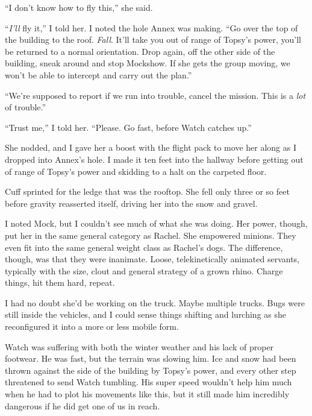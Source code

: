 ``I don't know how to fly this,'' she said.



``\emph{I'll} fly it,'' I told her.  I noted the hole Annex was making.  ``Go over the top of the building to the roof.  \emph{Fall}.  It'll take you out of range of Topsy's power, you'll be returned to a normal orientation.  Drop again, off the other side of the building, sneak around and stop Mockshow.  If she gets the group moving, we won't be able to intercept and carry out the plan.''



``We're supposed to report if we run into trouble, cancel the mission.  This is a \emph{lot} of trouble.''



``Trust me,'' I told her.  ``Please.  Go fast, before Watch catches up.''



She nodded, and I gave her a boost with the flight pack to move her along as I dropped into Annex's hole.  I made it ten feet into the hallway before getting out of range of Topsy's power and skidding to a halt on the carpeted floor.



Cuff sprinted for the ledge that was the rooftop.  She fell only three or so feet before gravity reasserted itself, driving her into the snow and gravel.



I noted Mock, but I couldn't see much of what she was doing.  Her power, though, put her in the same general category as Rachel.  She empowered minions.  They even fit into the same general weight class as Rachel's dogs.  The difference, though, was that they were inanimate.  Loose, telekinetically animated servants, typically with the size, clout and general strategy of a grown rhino.  Charge things, hit them hard, repeat.



I had no doubt she'd be working on the truck.  Maybe multiple trucks.  Bugs were still inside the vehicles, and I could sense things shifting and lurching as she reconfigured it into a more or less mobile form.



Watch was suffering with both the winter weather and his lack of proper footwear.  He was fast, but the terrain was slowing him.  Ice and snow had been thrown against the side of the building by Topsy's power, and every other step threatened to send Watch tumbling.  His super speed wouldn't help him much when he had to plot his movements like this, but it still made him incredibly dangerous if he did get one of us in reach.



